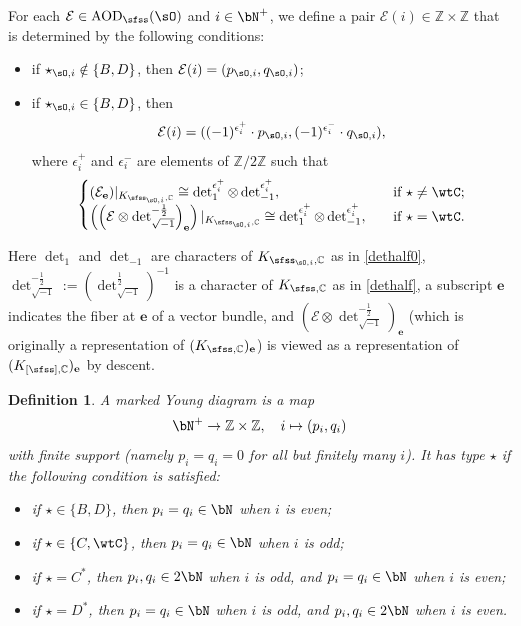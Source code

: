 \documentclass[11pt,a4paper]{amsart}
\newcommand{\CE}{{\mathcal {E}}}
\newcommand{\Z}{\mathbb{Z}}
\numberwithin{equation}{section}
\newtheorem{defn}[thm]{Definition}
\theoremstyle{remark}
\def\AOD{\mathrm{AOD}}
\begin{document}
For each $\CE\in \AOD_\sfss(\sO)$ and $i\in \bN^+$, we define a pair   $\CE(i)\in \Z\times \Z$ that is determined by the following conditions:
\begin{itemize}
    \item if $\star_{\sO,i}\notin\{B,D\}$, then $\CE(i)=(p_{\sO,i},q_{\sO,i})$;
    \item if $\star_{\sO,i}\in\{B,D\}$, then
    \[
    \CE(i)=((-1)^{\epsilon_i^+} \cdot p_{\sO,i}, (-1)^{\epsilon_i^-}\cdot  q_{\sO,i}),
    \]
    where $\epsilon_i^+$ and $\epsilon_i^-$ are elements of $\Z/2\Z$ such that
   \[
   \begin{cases}
       (\CE_{\mathbf e})|_{K_{\sfss_{\sO,i},\C}}\cong \det_1^{\epsilon_i^+} \otimes \det_{-1}^{\epsilon_i^+},\quad &\textrm{if $\star\neq \wtC$};\\
       \left(\left(\CE\otimes \det_{\sqrt{-1}}^{-\frac{1}{2}}\right)_{\mathbf e}\right)|_{K_{\sfss_{\sO,i},\C}}\cong \det_1^{\epsilon_i^+} \otimes \det_{-1}^{\epsilon_i^+},\quad &\textrm{if $\star= \wtC$}.
    \end{cases}
   \]
\end{itemize}
 Here $\det_{1}$ and $\det_{-1}$ are characters of $K_{\sfss_{\sO,i},\C}$ as in \eqref{dethalf0},  $\det_{\sqrt{-1}}^{-\frac{1}{2}}:=\left(\det_{\sqrt{-1}}^{\frac{1}{2}}\right)^{-1}$ is a character of $K_{\sfss, \C}$ as in \eqref{dethalf}, a subscript $\mathbf e$ indicates the fiber at $\mathbf e$ of a vector bundle, and  $\left(\CE\otimes \det_{\sqrt{-1}}^{-\frac{1}{2}}\right)_{\mathbf e}$ (which is originally a representation of $(K_{\sfss,\C})_\mathbf e$) is viewed as a representation of $(K_{[\sfss],\C})_\mathbf e$ by descent.



\begin{defn}
A marked Young diagram  is a map
 \[
 \bN^+\rightarrow \Z\times \Z,\quad i\mapsto (p_i,q_i)
 \]
 with finite support (namely $p_i=q_i=0$ for all but finitely many $i$). It has  type $\star$ if the following condition is satisfied:
 \begin{itemize}
     \item if $\star\in\{B,D\}$, then $p_i=q_i\in \bN$ when $i$ is even;
     \item if $\star\in\{C,\wtC\}$, then $p_i=q_i\in \bN$ when $i$ is odd;
     \item if $\star=C^*$, then $p_i, q_i\in 2\bN$ when $i$ is odd, and $p_i= q_i\in \bN$  when $i$ is even;
     \item if $\star=D^*$, then  $p_i= q_i\in \bN$  when $i$ is odd, and $p_i, q_i\in 2\bN$  when $i$ is even.
 \end{itemize}
\end{defn}
\end{document}
